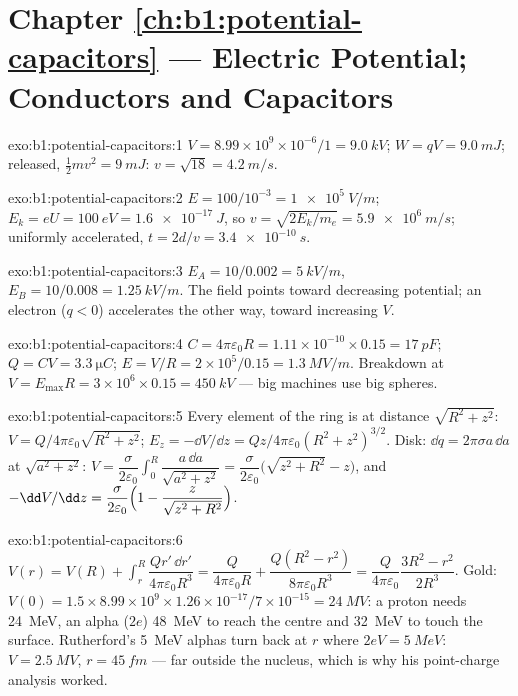 \section*{Chapter \ref{ch:b1:potential-capacitors} --- Electric Potential; Conductors and Capacitors}

\begin{solution}{exo:b1:potential-capacitors:1}
$V = 8.99 \times 10^9 \times 10^{-6}/1 = \qty{9.0}{kV}$; $W = qV = \qty{9.0}{mJ}$;
released, $\tfrac12mv^2 = \qty{9}{mJ}$: $v = \sqrt{18} = \qty{4.2}{m/s}$.
\end{solution}

\begin{solution}{exo:b1:potential-capacitors:2}
$E = 100/10^{-3} = \qty{1e5}{V/m}$; $E_k = eU = \qty{100}{eV} = \qty{1.6e-17}{J}$,
so $v = \sqrt{2E_k/m_e} = \qty{5.9e6}{m/s}$; uniformly accelerated,
$t = 2d/v = \qty{3.4e-10}{s}$.
\end{solution}

\begin{solution}{exo:b1:potential-capacitors:3}
$E_A = 10/0.002 = \qty{5}{kV/m}$, $E_B = 10/0.008 = \qty{1.25}{kV/m}$. The
field points toward decreasing potential; an electron ($q < 0$)
accelerates the other way, toward increasing $V$.
\end{solution}

\begin{solution}{exo:b1:potential-capacitors:4}
$C = 4\pi\varepsilon_0R = 1.11 \times 10^{-10} \times 0.15 = \qty{17}{pF}$; $Q = CV =
\qty{3.3}{\micro C}$; $E = V/R = 2 \times 10^5/0.15 = \qty{1.3}{MV/m}$. Breakdown
at $V = E_{\max}R = 3 \times 10^6 \times 0.15 = \qty{450}{kV}$ --- big machines
use big spheres.
\end{solution}

\begin{solution}{exo:b1:potential-capacitors:5}
Every element of the ring is at distance $\sqrt{R^2 + z^2}$: $V =
Q/4\pi\varepsilon_0\sqrt{R^2 + z^2}$; $E_z = -\dd V/\dd z = Qz/4\pi\varepsilon_0(R^2 +
z^2)^{3/2}$. Disk: $\dd q = 2\pi\sigma a\,\dd a$ at $\sqrt{a^2 + z^2}$: $V =
\dfrac{\sigma}{2\varepsilon_0}\displaystyle\int_0^R\dfrac{a\,\dd a}{\sqrt{a^2 + z^2}} =
\dfrac{\sigma}{2\varepsilon_0}\bigl(\sqrt{z^2 + R^2} - z\bigr)$, and $-\dd V/\dd z =
\dfrac{\sigma}{2\varepsilon_0}\Bigl(1 - \dfrac{z}{\sqrt{z^2 + R^2}}\Bigr)$.
\end{solution}

\begin{solution}{exo:b1:potential-capacitors:6}
$V(r) = V(R) + \displaystyle\int_r^R\dfrac{Qr'\,\dd r'}{4\pi\varepsilon_0R^3} =
\dfrac{Q}{4\pi\varepsilon_0R} + \dfrac{Q(R^2 - r^2)}{8\pi\varepsilon_0R^3} = \dfrac{Q}{4\pi\varepsilon_0}
\dfrac{3R^2 - r^2}{2R^3}$. Gold: $V(0) = 1.5 \times 8.99 \times 10^9 \times 1.26 \times
10^{-17}/7 \times 10^{-15} = \qty{24}{MV}$: a proton needs \qty{24}{MeV}, an alpha
($2e$) \qty{48}{MeV} to reach the centre and \qty{32}{MeV} to touch the
surface. Rutherford's \qty{5}{MeV} alphas turn back at $r$ where $2eV =
\qty{5}{MeV}$: $V = \qty{2.5}{MV}$, $r = \qty{45}{fm}$ --- far outside the
nucleus, which is why his point-charge analysis worked.
\end{solution}

